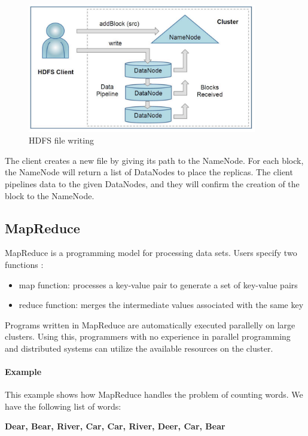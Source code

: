 \begin{figure}[H]
	\includegraphics[width=100mm, keepaspectratio]{figures/hdfs_client.png}
	\centering
	\caption*{HDFS file writing}
\end{figure}
The client creates a new file by giving its path to the NameNode. For each block, the NameNode will return a list of DataNodes to place the replicas. The client pipelines data to the given DataNodes, and they will confirm the creation of the block to the NameNode.
\subsection{MapReduce}
MapReduce is a programming model for processing data sets. Users specify two functions \cite{Dean:2004:MSD:1251254.1251264}:
\begin{itemize}
	\item map function: processes a key-value pair to generate a set of key-value pairs
	\item reduce function: merges the intermediate values associated with the same key
\end{itemize}

Programs written in MapReduce are automatically executed parallelly on large clusters. Using this, programmers with no experience in parallel programming and distributed systems can utilize the available resources on the cluster.
\paragraph{Example \cite{MapReduce-example}}
This example shows how MapReduce handles the problem of counting words. We have the following list of words: 
\begin{center}
	\textbf{Dear, Bear, River, Car, Car, River, Deer, Car, Bear}
\end{center}

